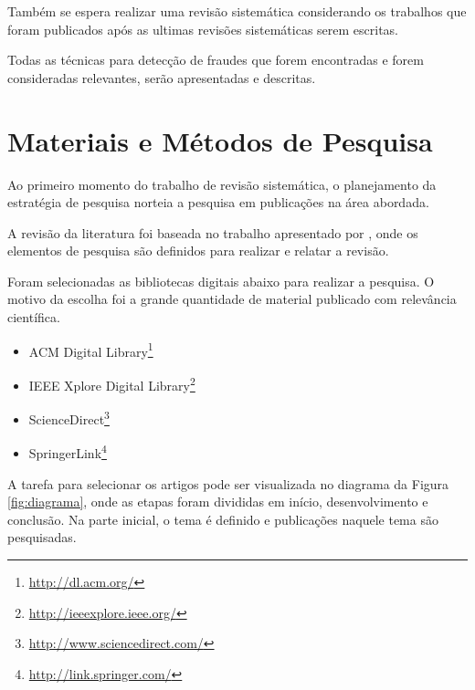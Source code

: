 \documentclass[smallextended]{svjour3}       %
\begin{document}
Também se espera realizar uma revisão sistemática considerando os trabalhos que foram publicados após as ultimas revisões sistemáticas serem escritas.

Todas as técnicas para detecção de fraudes que forem encontradas e forem consideradas relevantes, serão apresentadas e descritas.

\section{Materiais e Métodos de Pesquisa}
\label{sec:1}

Ao primeiro momento do trabalho de revisão sistemática, o planejamento da estratégia de pesquisa norteia a pesquisa em publicações na área abordada.

A revisão da literatura foi baseada no trabalho apresentado por \cite{Kitchenham07guidelinesfor}, onde os elementos de pesquisa são definidos para realizar e relatar a revisão.

Foram selecionadas as bibliotecas digitais abaixo para realizar a pesquisa. O motivo da escolha foi a grande quantidade de material publicado com relevância científica.

\begin{itemize}
	\item \textsf{ACM Digital Library}\footnote{\url{http://dl.acm.org/}}
	
	\item \textsf{IEEE Xplore Digital Library}\footnote{\url{http://ieeexplore.ieee.org/}}
	
	\item \textsf{ScienceDirect}\footnote{\url{http://www.sciencedirect.com/}} 	
	
	\item \textsf{SpringerLink}\footnote{\url{http://link.springer.com/}}
\end{itemize}

A tarefa para selecionar os artigos pode ser visualizada no diagrama da Figura \ref{fig:diagrama}, onde as etapas foram divididas em início, desenvolvimento e conclusão. Na parte inicial, o tema é definido e publicações naquele tema são pesquisadas. 
\end{document}
